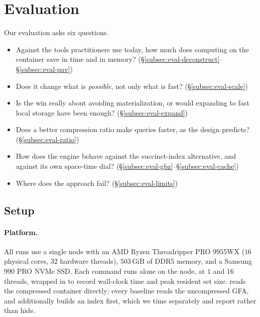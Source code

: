 \section{Evaluation}
\label{sec:eval}

Our evaluation asks six questions.

\begin{itemize}[noitemsep,topsep=3pt,leftmargin=*]
  \item[\textbf{Q1}] Against the tools practitioners use today, how much does
        computing on the container save in time and in memory?
        (\S\ref{subsec:eval-deconstruct}--\S\ref{subsec:eval-pav})
  \item[\textbf{Q2}] Does it change what is \emph{possible}, not only what is
        fast? (\S\ref{subsec:eval-scale})
  \item[\textbf{Q3}] Is the win really about avoiding materialization, or would
        expanding to fast local storage have been enough?
        (\S\ref{subsec:eval-expand})
  \item[\textbf{Q4}] Does a better compression ratio make queries faster, as the
        design predicts? (\S\ref{subsec:eval-ratio})
  \item[\textbf{Q5}] How does the engine behave against the succinct-index
        alternative, and against its own space-time dial?
        (\S\ref{subsec:eval-gbz}--\S\ref{subsec:eval-cache})
  \item[\textbf{Q6}] Where does the approach fail? (\S\ref{subsec:eval-limits})
\end{itemize}

\subsection{Setup}
\label{subsec:eval-setup}

\paragraph{Platform.}
All runs use a single node with an AMD Ryzen Threadripper PRO 9955WX ($16$
physical cores, $32$ hardware threads), $503$\,GiB of DDR5 memory, and a Samsung
990 PRO NVMe SSD. Each command runs alone on the node, at $1$ and $16$ threads,
wrapped in  to record wall-clock time and peak resident set
size. \sys reads the compressed container directly; every baseline reads the
uncompressed GFA, and  additionally builds an  index first,
which we time separately and report rather than hide.

